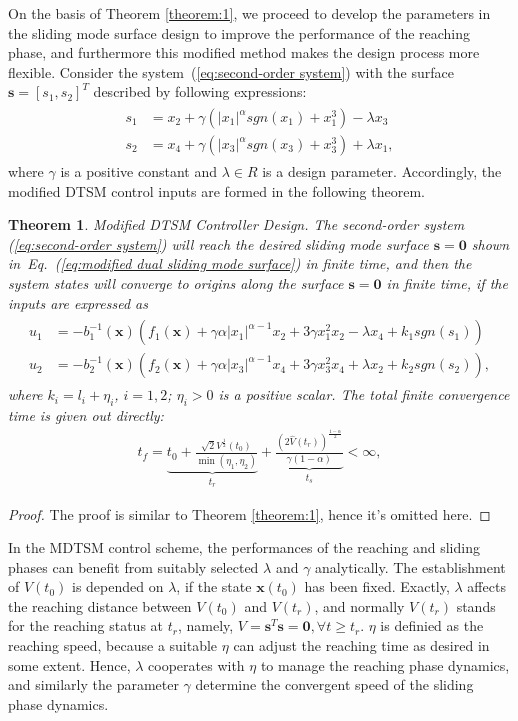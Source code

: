 \documentclass[3p]{elsarticle}
\theoremstyle{plain}
\newtheorem{mythm}{Theorem}
\theoremstyle{remark}
\begin{document}
On the basis of Theorem \ref{theorem:1}, we proceed to develop the parameters in the sliding mode  surface design to improve the performance of the reaching phase, and furthermore this modified method makes the design process more flexible. Consider the system~(\ref{eq:second-order system}) with the surface $\bm s = [s_1,s_2]^T$ described by following expressions:
\begin{align}
\begin{split}
s_1 &= x_2+\gamma(\vert x_1\vert^{\alpha} sgn(x_1)+x_1^3)-\lambda x_3\\
s_2 &= x_4+\gamma(\vert x_3\vert^{\alpha} sgn(x_3)+x_3^3)+\lambda x_1,\label{eq:modified dual sliding mode  surface}
\end{split}
\end{align}
where $\gamma$ is a positive constant and $\lambda\in R$ is a design parameter. Accordingly, the modified DTSM control inputs are formed in the following theorem.
\begin{mythm}\label{theorem:2}Modified DTSM Controller Design.
The second-order system (\ref{eq:second-order system}) will reach the desired sliding mode  surface $\bm s = \bm 0$ shown in~Eq.~(\ref{eq:modified dual sliding mode  surface}) in finite time, and then the system states will converge to origins along the surface $\bm s=\bm 0$ in finite time, if the inputs are expressed as
\begin{align}
\begin{split}
u_1 &= -b_1^{-1}(\bm x)(f_1(\bm x)+\gamma\alpha\vert x_1\vert^{\alpha-1}x_2+3\gamma x_1^2x_2-\lambda x_4+k_1sgn(s_1))\\
u_2 &= -b_2^{-1}(\bm x)(f_2(\bm x)+\gamma\alpha\vert x_3\vert^{\alpha-1}x_4+3\gamma x_3^2x_4+\lambda x_2+k_2sgn(s_2)),\label{eq:modified input}
\end{split}
\end{align}
where $k_i = l_i+\eta_i$, $i=1,2$; $\eta_i>0$ is a positive scalar. The total finite convergence time is given out directly:
\begin{align}
t_f = \underbrace{t_0+\frac{\sqrt{2}V^{\frac{1}{2}}(t_0)}{\min(\eta_1,\eta_2)}}_{t_r}+\underbrace{\frac{(2\hat V(t_r))^{\frac{1-\alpha}{2}}}{\gamma(1-\alpha)}}_{t_s}<\infty,\label{eq:total convergence time}
\end{align}
\end{mythm}
\begin{proof}
The proof is similar to Theorem \ref{theorem:1}, hence it's omitted here.
\end{proof}
In the MDTSM control scheme, the performances of the reaching and sliding phases can benefit from suitably selected $\lambda$ and $\gamma$ analytically. The establishment of $V(t_0)$ is depended on $\lambda$, if the state $\bm x(t_0)$ has been fixed. Exactly, $\lambda$ affects the reaching distance between $V(t_0)$ and $V(t_r)$, and normally $V(t_r)$ stands for the reaching status at $t_r$, namely, $V=\bm s^T\bm s = \bm 0,\forall t\ge t_r$. $\eta$ is definied as the reaching speed, because a suitable $\eta$ can adjust the reaching time as desired in some extent. Hence, $\lambda$ cooperates with $\eta$ to manage the reaching phase dynamics, and similarly the parameter $\gamma$ determine the convergent speed of the sliding phase dynamics.
\end{document}
